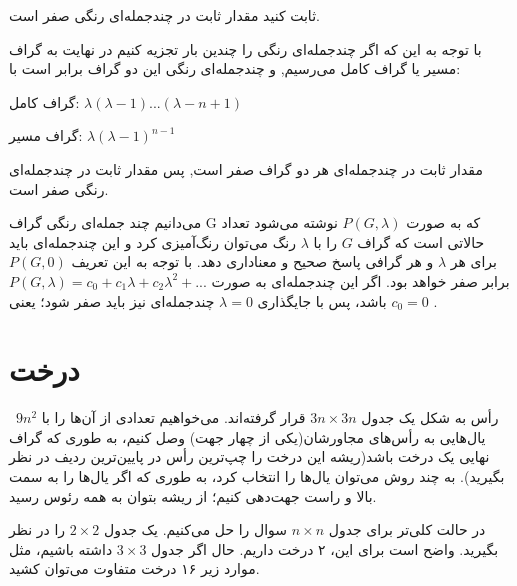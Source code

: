 \documentclass[11pt,largemargins]{h2wp}
\begin{document}
\question
ثابت کنید مقدار ثابت در چندجمله‌ای رنگی صفر است.

\solution
با توجه به این که اگر چند‌جمله‌ای رنگی را چندین بار تجزیه کنیم در نهایت به گراف مسیر یا گراف کامل می‌رسیم, و چند‌جمله‌ای رنگی این دو گراف برابر است با:
\begin{center}
گراف کامل:
$\lambda(\lambda-1)...(\lambda-n+1)$

گراف مسیر:
$\lambda(\lambda-1)^{n-1}$
\end{center}

مقدار ثابت در چند‌جمله‌ای هر دو گراف صفر است, پس مقدار ثابت در چند‌جمله‌ای رنگی صفر است.
\notes


می‌دانیم چند جمله‌ای رنگی گراف G که به صورت $P(G,\lambda)$ نوشته می‌شود تعداد حالاتی‌ است که گراف $G$ را با $\lambda$ رنگ می‌توان رنگ‌آمیزی کرد و این چندجمله‌ای باید برای هر $\lambda$ و هر گرافی پاسخ صحیح و معناداری دهد. با توجه به این تعریف $P(G,0)$ برابر صفر خواهد بود. اگر این چندجمله‌ای به صورت
$P(G,\lambda)=c_0+c_1\lambda+c_2\lambda^2+...$
باشد، پس با جایگذاری $\lambda=0$ چندجمله‌ای نیز باید صفر شود؛ یعنی
$c_0=0$
.

\chapter*{درخت}

\question

    ~$9n^2$ رأس به شکل یک جدول $3n \times 3n$ قرار گرفته‌اند. می‌خواهیم تعدادی از آن‌ها را با یال‌هایی به رأس‌های مجاورشان(یکی از چهار جهت) وصل کنیم، به طوری که گراف نهایی یک درخت باشد(ریشه این درخت را چپ‌ترین رأس در پایین‌ترین ردیف در نظر بگیرید).
        به چند روش می‌توان یال‌ها را انتخاب کرد، به طوری که اگر یال‌ها را به سمت بالا و راست جهت‌دهی کنیم؛ از ریشه بتوان به همه رئوس رسید.

\solution
در حالت کلی‌تر برای جدول $ n \times n $ سوال را حل می‌کنیم. یک جدول $ 2 \times 2 $ را در نظر بگیرید. واضح است برای این، ۲ درخت داریم. حال اگر جدول $ 3 \times 3 $ داشته باشیم، مثل موارد زیر ۱۶ درخت متفاوت می‌توان کشید.

\end{document}
